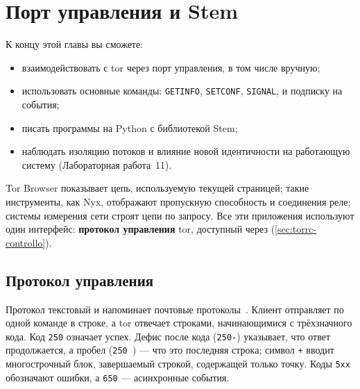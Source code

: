 \chapter{Порт управления и Stem}\label{cap:18-stem}

\begin{obiettivi}
К концу этой главы вы сможете:
\begin{itemize}[nosep]
  \item взаимодействовать с tor через порт управления, в том числе вручную;
  \item использовать основные команды: \texttt{GETINFO}, \texttt{SETCONF}, \texttt{SIGNAL},  и подписку на события;
  \item писать программы на Python с библиотекой Stem;
  \item наблюдать изоляцию потоков и влияние новой идентичности на работающую систему (Лабораторная работа~11).
\end{itemize}
\end{obiettivi}

Tor Browser показывает цепь, используемую текущей страницей; такие инструменты, как Nyx, отображают пропускную способность и соединения реле; системы измерения сети строят цепи по запросу. Все эти приложения используют один интерфейс: \textbf{протокол управления} tor, доступный через  (\cref{sec:torrc-controllo}).

\section{Протокол управления}\label{sec:stem-protocollo}

Протокол текстовый и напоминает почтовые протоколы~. Клиент отправляет по одной команде в строке, а tor отвечает строками, начинающимися с трёхзначного кода. Код \texttt{250} означает успех. Дефис после кода (\texttt{250-}) указывает, что ответ продолжается, а пробел (\texttt{250 }) — что это последняя строка; символ \texttt{+} вводит многострочный блок, завершаемый строкой, содержащей только точку. Коды \texttt{5xx} обозначают ошибки, а \texttt{650} — асинхронные события.

